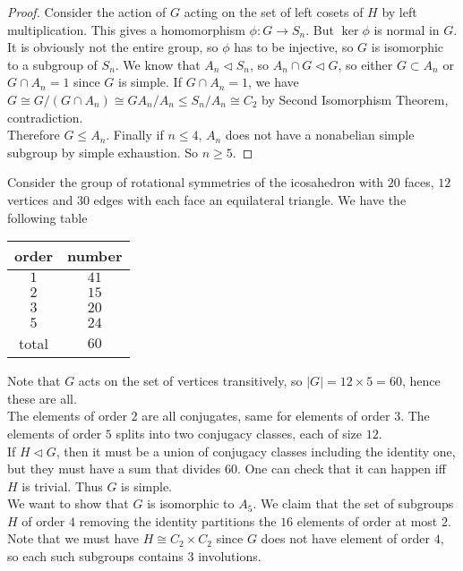 \begin{proof}
    Consider the action of $G$ acting on the set of left cosets of $H$ by left multiplication.
    This gives a homomorphism $\phi:G\to S_n$.
    But $\ker\phi$ is normal in $G$.
    It is obviously not the entire group, so $\phi$ has to be injective, so $G$ is isomorphic to a subgroup of $S_n$.
    We know that $A_n\lhd S_n$, so $A_n\cap G\lhd G$, so either $G\subset A_n$ or $G\cap A_n=1$ since $G$ is simple.
    If $G\cap A_n=1$, we have $G\cong G/(G\cap A_n)\cong GA_n/A_n\le S_n/A_n\cong C_2$ by Second Isomorphism Theorem, contradiction.\\
    Therefore $G\le A_n$.
    Finally if $n\le 4$, $A_n$ does not have a nonabelian simple subgroup by simple exhaustion.
    So $n\ge 5$.
\end{proof}
\begin{example}
    Consider the group of rotational symmetries of the icosahedron with $20$ faces, $12$ vertices and $30$ edges with each face an equilateral triangle.
    We have the following table
    \begin{center}
        \begin{tabular}{c|c}
            order&number\\
            \hline
            $1$&$41$\\
            $2$&$15$\\
            $3$&$20$\\
            $5$&$24$\\
            \hline
            total&$60$
        \end{tabular}
    \end{center}
    Note that $G$ acts on the set of vertices transitively, so $|G|=12\times 5=60$, hence these are all.\\
    The elements of order $2$ are all conjugates, same for elements of order $3$.
    The elements of order $5$ splits into two conjugacy classes, each of size $12$.\\
    If $H\lhd G$, then it must be a union of conjugacy classes including the identity one, but they must have a sum that divides $60$.
    One can check that it can happen iff $H$ is trivial.
    Thus $G$ is simple.\\
    We want to show that $G$ is isomorphic to $A_5$.
    We claim that the set of subgroups $H$ of order $4$ removing the identity partitions the $16$ elements of order at most $2$.
    Note that we must have $H\cong C_2\times C_2$ since $G$ does not have element of order $4$, so each such subgroups contains $3$ involutions.

\end{example}
